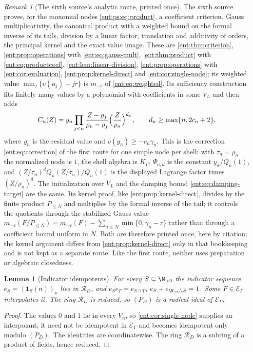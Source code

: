 \documentclass[11pt]{article}
\theoremstyle{plain}
\newtheorem{lemma}[lemma]{Lemma}
\theoremstyle{plain}
\theoremstyle{plain}
\theoremstyle{definition}
\theoremstyle{definition}
\theoremstyle{definition}
\theoremstyle{definition}
\theoremstyle{remark}
\newtheorem{remark}[remark]{Remark}
\newcommand{\RD}{\mathcal R_D}\newcommand{\Ucal}{\mathcal U}
\begin{document}
\begin{remark}[The sixth source's analytic route, printed once]
\label{ent:ps:rem:route}
The sixth source proves, for the monomial nodes \eqref{ent:ps:eq:product}, a
coefficient criterion, Gauss multiplicativity, the canonical product with a
weighted bound on the formal inverse of its tails, division by a linear
factor, translation and additivity of orders, the principal kernel and the
exact value image. These are \cref{ent:thm:criterion},
\cref{ent:prop:operations} with \eqref{ent:eq:gauss-mult},
\cref{ent:thm:product} with \eqref{ent:eq:productcoef},
\cref{ent:lem:linear-division}, \cref{ent:prop:operations} with
\cref{ent:cor:evaluation}, \cref{ent:prop:kernel-direct} and
\cref{ent:cor:single-node}; its weighted value
$\min_j\{v(a_j)-jr\}$ is $m_{-r}$ of \eqref{ent:eq:weighted}. Its sufficiency
construction fits finitely many values by a polynomial with coefficients in
some $V_L$ and then adds
\[
 C_n(Z)=y_n\prod_{j<n}\frac{Z-\rho_j}{\rho_n-\rho_j}\Bigl(\frac
 Z{\rho_n}\Bigr)^{d_n},\qquad d_n\ge\max\{n,2c_n+2\},
\]
where $y_n$ is the residual value and $v(y_n)\ge-c_n\gamma_n$. This is the
correction \eqref{ent:eq:correction} of the first route for one simple node
per shell: with $\tau_n=\rho_n$ the normalized node is $1$, the shell algebra
is $K_\Gamma$, $\Psi_{n,d}$ is the constant $y_n/Q_n(1)$, and
$(Z/\tau_n)^dQ_n(Z/\tau_n)/Q_n(1)$ is the displayed Lagrange factor times
$(Z/\rho_n)^d$. The initialization over $V_L$ and the damping bound
\eqref{ent:eq:damping-target} are the same. Its kernel proof, like
\cref{ent:prop:kernel-direct}, divides by the finite product $P_{\le N}$ and
multiplies by the formal inverse of the tail; it controls the quotients
through the stabilized Gauss value
$m_{-r}(F/P_{\le N})=m_{-r}(F)-\sum_{n\le N}\min\{0,\gamma_n-r\}$ rather than
through a coefficient bound uniform in $N$. Both are therefore printed once,
here by citation; the kernel argument differs from
\cref{ent:prop:kernel-direct} only in that bookkeeping and is not kept as a
separate route. Like the first route, neither uses preparation or algebraic
closedness.
\end{remark}

\begin{lemma}[Indicator idempotents]\label{ent:ps:lem:idempotents}
For every $S\subseteq\N_{>0}$ the indicator sequence
$e_S=(\mathbf 1_S(n))_n$ lies in $\RD$, and
$e_Se_T=e_{S\cap T}$, $e_S+e_{\N_{>0}\setminus S}=1$. Some $F\in\mathcal
E_\Gamma$ interpolates it. The ring $\RD$ is reduced, so $(P_D)$ is a radical
ideal of $\mathcal E_\Gamma$.
\end{lemma}
\begin{proof}
The values $0$ and $1$ lie in every $V_n$, so \cref{ent:cor:single-node}
supplies an interpolant; it need not be idempotent in $\mathcal E_\Gamma$ and
becomes idempotent only modulo $(P_D)$. The identities are coordinatewise.
The ring $\RD$ is a subring of a product of fields, hence reduced.
\end{proof}
\end{document}
